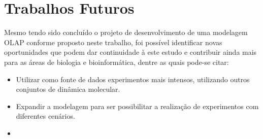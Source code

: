 \chapter{Trabalhos Futuros}
	Mesmo tendo sido concluído o projeto de desenvolvimento de uma modelagem OLAP conforme proposto neste trabalho, foi possível identificar novas oportunidades que podem dar continuidade à este estudo e contribuir ainda mais para as áreas de biologia e bioinformática, dentre as quais pode-se citar:

\begin{itemize}
 	\item Utilizar como fonte de dados experimentos mais intensos, utilizando outros conjuntos de dinâmica molecular.
 	\item Expandir a modelagem para ser possibilitar a realização de experimentos com diferentes cenários.
 	\item 

\end{itemize}